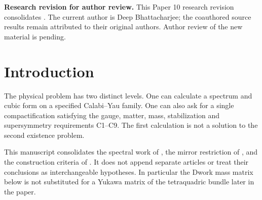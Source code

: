 
\begin{abstract}
We combine explicit spectral calculations for the Dwork and weighted
Fermat pencils with an audit of the Geometric Selection Conjecture.
The residue calculation determines the character labels, cubic couplings
and invariant-direction mass maps, while an index argument excludes three
standard-embedding families on free quotients of thirteen hypergeometric
complete-intersection types. For a nonstandard construction we fix one
tetraquadric equation, prove smoothness and a free degree-four action,
and calculate equivariant bundle cohomology by an exact determinant
certificate. Its projected charged spectrum contains three families and
one Higgs doublet pair. At the specified split-bundle point, however, an
additional Abelian gauge factor survives, the perturbative Yukawa matrices
fail the required rank test, and the tree-level volume remains flat.
We give selection and perturbation criteria and a targeted extension
construction, keeping their hypotheses separate from verified vacuum data.
No vacuum satisfying all nine conditions is constructed; the full
Geometric Selection Conjecture remains unproved.
\end{abstract}
\maketitle
\noindent\textbf{Research revision for author review.}
This Paper 10 research revision consolidates
\cite{Dwork,Mirror,Paper10}. The current author is Deep Bhattacharjee;
the coauthored source results remain attributed to their original authors.
Author review of the new material is pending.
\setcounter{tocdepth}{1}
\clearpage
\tableofcontents
\clearpage

\section{Introduction}\label{sec:intro}
The physical problem has two distinct levels. One can calculate a
spectrum and cubic form on a specified Calabi--Yau family. One can also
ask for a single compactification satisfying the gauge, matter, mass,
stabilization and supersymmetry requirements C1--C9. The first calculation
is not a solution to the second existence problem.

This manuscript consolidates the spectral work of \cite{Dwork}, the
mirror restriction of \cite{Mirror}, and the construction criteria of
\cite{Paper10}. It does not append separate articles or treat their
conclusions as interchangeable hypotheses. In particular the Dwork
mass matrix below is not substituted for a Yukawa matrix of the
tetraquadric bundle later in the paper.

